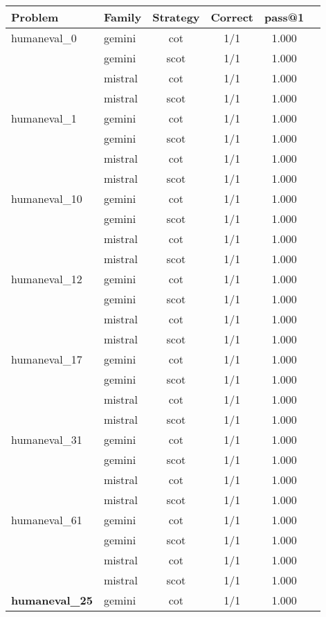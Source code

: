 \documentclass[11pt]{article}
\begin{document}
\begin{table}[h]
\centering
\footnotesize
\begin{tabular}{llcccc}
\toprule
\textbf{Problem} & \textbf{Family} & \textbf{Strategy} & \textbf{Correct} & \textbf{pass@1} \\
\midrule
humaneval\_0 & gemini & cot & 1/1 & 1.000 \\
 & gemini & scot & 1/1 & 1.000 \\
 & mistral & cot & 1/1 & 1.000 \\
 & mistral & scot & 1/1 & 1.000 \\
\midrule
humaneval\_1 & gemini & cot & 1/1 & 1.000 \\
 & gemini & scot & 1/1 & 1.000 \\
 & mistral & cot & 1/1 & 1.000 \\
 & mistral & scot & 1/1 & 1.000 \\
\midrule
humaneval\_10 & gemini & cot & 1/1 & 1.000 \\
 & gemini & scot & 1/1 & 1.000 \\
 & mistral & cot & 1/1 & 1.000 \\
 & mistral & scot & 1/1 & 1.000 \\
\midrule
humaneval\_12 & gemini & cot & 1/1 & 1.000 \\
 & gemini & scot & 1/1 & 1.000 \\
 & mistral & cot & 1/1 & 1.000 \\
 & mistral & scot & 1/1 & 1.000 \\
\midrule
humaneval\_17 & gemini & cot & 1/1 & 1.000 \\
 & gemini & scot & 1/1 & 1.000 \\
 & mistral & cot & 1/1 & 1.000 \\
 & mistral & scot & 1/1 & 1.000 \\
\midrule
humaneval\_31 & gemini & cot & 1/1 & 1.000 \\
 & gemini & scot & 1/1 & 1.000 \\
 & mistral & cot & 1/1 & 1.000 \\
 & mistral & scot & 1/1 & 1.000 \\
\midrule
humaneval\_61 & gemini & cot & 1/1 & 1.000 \\
 & gemini & scot & 1/1 & 1.000 \\
 & mistral & cot & 1/1 & 1.000 \\
 & mistral & scot & 1/1 & 1.000 \\
\midrule
\textbf{humaneval\_25} & gemini & cot & 1/1 & 1.000 \\

\end{tabular}
\end{table}
\end{document}
